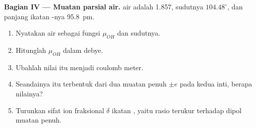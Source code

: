 \begin{problem}
\medskip
\noindent\textbf{Bagian IV --- Muatan parsial air.}
 air adalah \qty{1.857}{\debye}, sudutnya $104.48^\circ$, dan
panjang ikatan -nya \qty{95.8}{pm}.
\begin{enumerate}[resume]
  \item Nyatakan  air sebagai fungsi  $\mu_{OH}$
        dan sudutnya.
  \item Hitunglah $\mu_{OH}$ dalam debye.
  \item Ubahlah nilai itu menjadi coulomb meter.
  \item Seandainya  itu terbentuk dari dua muatan penuh
        $\pm e$ pada kedua inti, berapa nilainya?
  \item Turunkan sifat ion fraksional $\delta$ ikatan , yaitu
        rasio  terukur terhadap dipol muatan penuh.
\end{enumerate}
\end{problem}
